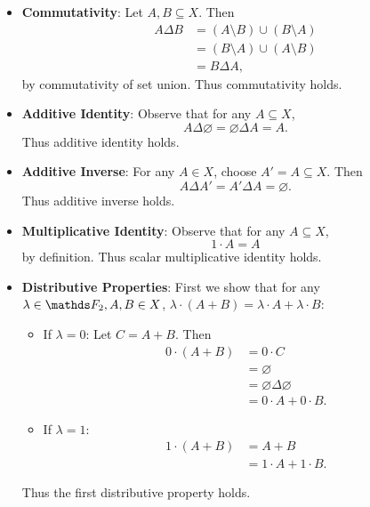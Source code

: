 \documentclass{homework}
\begin{document}
\begin{solution}
\begin{itemize}
    \item \textbf{Commutativity}: Let $A,B\subseteq X$. Then 
      \begin{align*}
        A\Delta B &= \left( A\setminus B \right) \cup \left( B\setminus A \right) \\
                  &= \left( B\setminus A \right) \cup \left( A\setminus B \right)  \\
                  &= B\Delta A
      ,\end{align*} by commutativity of set union. Thus commutativity holds.

    \item \textbf{Additive Identity}: Observe that for any $A\subseteq X$, \[
      A\Delta \varnothing=\varnothing\Delta A = A
      .\] Thus additive identity holds.
      
    \item \textbf{Additive Inverse}: For any $A\in X$, choose $A'=A\subseteq X$. Then \[
        A\Delta A' = A' \Delta A = \varnothing
      .\] Thus additive inverse holds.

    \item \textbf{Multiplicative Identity}: Observe that for any $A\subseteq X$, \[
      1\cdot A=A
    \] by definition. Thus scalar multiplicative identity holds.

  \item \textbf{Distributive Properties}: First we show that for any $\lambda\in \F_2, A,B \in X$,
    $ \lambda\cdot (A+B)=\lambda\cdot A+\lambda\cdot B$:
    \begin{itemize}
      \item If $\lambda=0$: Let $C=A+B$. Then
        \begin{align*}
          0\cdot (A+B) &= 0\cdot C \\
          &= \varnothing \\
          &= \varnothing\Delta\varnothing \\
          &= 0\cdot A+0\cdot B
        .\end{align*}
      \item If $\lambda=1$:
        \begin{align*}
          1\cdot (A+B) &= A+B \\
          &= 1\cdot A+1\cdot B
        .\end{align*}
    \end{itemize}
     Thus the first distributive property holds.


\end{itemize}
\end{solution}
\end{document}
